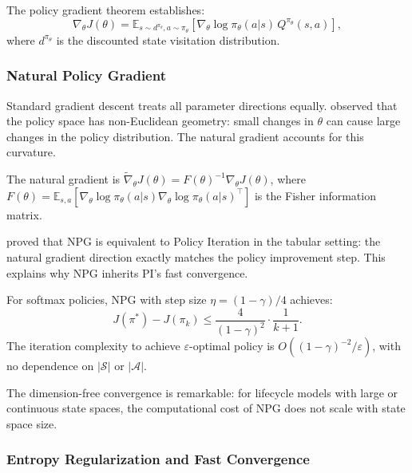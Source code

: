 The policy gradient theorem \citep{SuttonMcAllester2000} establishes:
\begin{equation}
\nabla_\theta J(\theta) = \mathbb{E}_{s \sim d^{\pi_\theta}, a \sim \pi_\theta} \left[ \nabla_\theta \log \pi_\theta(a|s) \, Q^{\pi_\theta}(s,a) \right],
\end{equation}
where $d^{\pi_\theta}$ is the discounted state visitation distribution.


\subsubsection{Natural Policy Gradient}

Standard gradient descent treats all parameter directions equally. \citet{Kakade2001} observed that the policy space has non-Euclidean geometry: small changes in $\theta$ can cause large changes in the policy distribution. The natural gradient accounts for this curvature.

\begin{definition}
The natural gradient is $\tilde{\nabla}_\theta J(\theta) = F(\theta)^{-1} \nabla_\theta J(\theta)$, where $F(\theta) = \mathbb{E}_{s,a}[\nabla_\theta \log \pi_\theta(a|s) \nabla_\theta \log \pi_\theta(a|s)^\top]$ is the Fisher information matrix.
\end{definition}

\citet{Kakade2001} proved that NPG is equivalent to Policy Iteration in the tabular setting: the natural gradient direction exactly matches the policy improvement step. This explains why NPG inherits PI's fast convergence.

\begin{theorem}
\label{thm:npg_convergence}
For softmax policies, NPG with step size $\eta = (1-\gamma)/4$ achieves:
\begin{equation}
J(\pi^*) - J(\pi_k) \leq \frac{4}{(1-\gamma)^2} \cdot \frac{1}{k+1}.
\end{equation}
The iteration complexity to achieve $\varepsilon$-optimal policy is $O((1-\gamma)^{-2}/\varepsilon)$, with no dependence on $|\mathcal{S}|$ or $|\mathcal{A}|$.
\end{theorem}

The dimension-free convergence is remarkable: for lifecycle models with large or continuous state spaces, the computational cost of NPG does not scale with state space size.


\subsubsection{Entropy Regularization and Fast Convergence}

